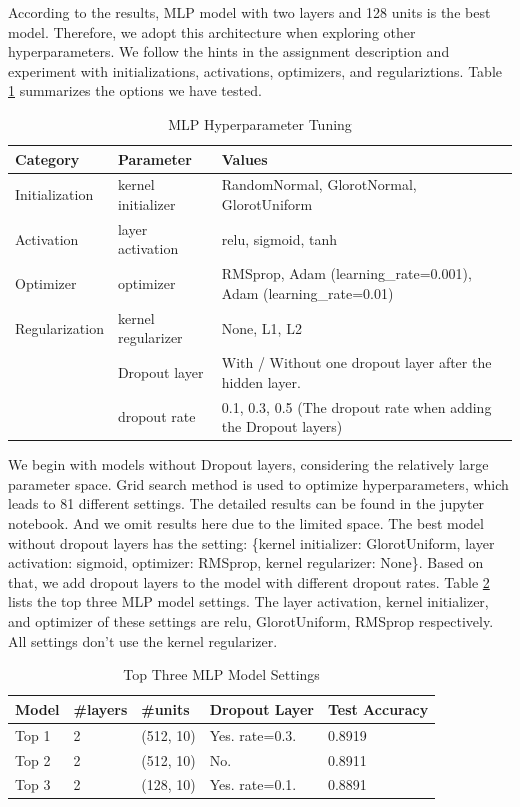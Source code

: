 \documentclass{article}
\begin{document}
\par
According to the results,  MLP model with two layers and 128 units is the best model. Therefore, we adopt this architecture when exploring other hyperparameters. We follow the hints in the assignment description and experiment with initializations, activations, optimizers, and regulariztions. Table \ref{tab:1-hy-mnist} summarizes the options we have tested.
\begin{table}[!ht]
    \centering
    \caption{MLP Hyperparameter Tuning}
    \label{tab:1-hy-mnist}
    \begin{tabular}{lll}
        \toprule
        \textbf{Category} & \textbf{Parameter} & \textbf{Values}\\
        \midrule
        Initialization & kernel initializer & RandomNormal, GlorotNormal, GlorotUniform\\
        Activation & layer activation & relu, sigmoid, tanh\\
        Optimizer & optimizer & RMSprop, Adam (learning_rate=0.001), Adam (learning_rate=0.01)\\
        Regularization & kernel regularizer & None, L1, L2\\
                       & Dropout layer & With / Without one dropout layer after the hidden layer.\\
                       & dropout rate & 0.1, 0.3, 0.5 (The dropout rate when adding the Dropout layers)\\
        \bottomrule
    \end{tabular}
\end{table}
\par
We begin with models without Dropout layers, considering the relatively large parameter space. Grid search method is used to optimize hyperparameters, which leads to 81 different settings. The detailed results can be found in the jupyter notebook. And we omit results here due to the limited space. The best model without dropout layers has the setting: \{kernel initializer: GlorotUniform, layer activation: sigmoid, optimizer: RMSprop, kernel regularizer: None\}. Based on that, we add dropout layers to the model with different dropout rates. Table \ref{tab:1-top3-mlp} lists the top three MLP model settings. The layer activation, kernel initializer, and optimizer of these settings are relu, GlorotUniform, RMSprop respectively. All settings don't use the kernel regularizer.
\begin{table}[!ht]
    \centering
    \caption{Top Three MLP Model Settings}
    \label{tab:1-top3-mlp}
    \begin{tabular}{lllll}
        \toprule
        \textbf{Model} & \textbf{\#layers} & \textbf{\#units} & \textbf{Dropout Layer} & \textbf{Test Accuracy}\\
        \midrule
        Top 1 & 2 & (512, 10) & Yes. rate=0.3. & 0.8919\\
        Top 2 & 2 & (512, 10) & No. & 0.8911\\
        Top 3 & 2 & (128, 10) & Yes. rate=0.1. & 0.8891\\
        \bottomrule
    \end{tabular}
\end{table}
\end{document}

